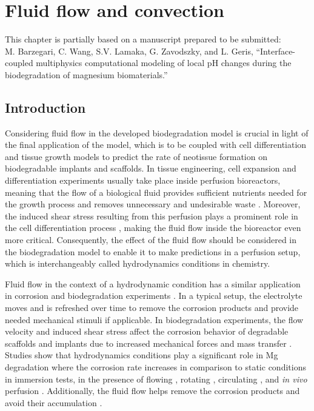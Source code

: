 \chapter{Fluid flow and convection}\label{ch:fluid}

\begin{shaded}
This chapter is partially based on a manuscript prepared to be submitted:\\
M. Barzegari, C. Wang, S.V. Lamaka, G. Zavodszky, and L. Geris, ``Interface-coupled multiphysics computational modeling of local pH changes during the biodegradation of magnesium biomaterials.''
\end{shaded}

\section{Introduction}

Considering fluid flow in the developed biodegradation model is crucial in light of the final application of the model, which is to be coupled with cell differentiation and tissue growth models to predict the rate of neotissue formation on biodegradable implants and scaffolds. In tissue engineering, cell expansion and differentiation experiments usually take place inside perfusion bioreactors, meaning that the flow of a biological fluid provides sufficient nutrients needed for the growth process and removes unnecessary and undesirable waste \cite{Sikavitsas2005,Grayson2010,Sonnaert2014}. Moreover, the induced shear stress resulting from this perfusion plays a prominent role in the cell differentiation process \cite{Song2013,McCoy2012,Rauh2011,Papantoniou2013}, making the fluid flow inside the bioreactor even more critical. Consequently, the effect of the fluid flow should be considered in the biodegradation model to enable it to make predictions in a perfusion setup, which is interchangeably called hydrodynamics conditions in chemistry.

Fluid flow in the context of a hydrodynamic condition has a similar application in corrosion and biodegradation experiments \cite{Wang2014}. In a typical setup, the electrolyte moves and is refreshed over time to remove the corrosion products and provide needed mechanical stimuli if applicable. In biodegradation experiments, the flow velocity and induced shear stress affect the corrosion behavior of degradable scaffolds and implants due to increased mechanical forces and mass transfer \cite{Wang2014}. Studies show that hydrodynamics conditions play a significant role in Mg degradation \cite{Levesque2008} where the corrosion rate increases in comparison to static conditions in immersion tests, in the presence of flowing \cite{Li2012}, rotating \cite{Jafarzadeh2009}, circulating \cite{Chen2010}, and \textit{in vivo} perfusion \cite{Witte2013}. Additionally, the fluid flow helps remove the corrosion products and avoid their accumulation \cite{Hiromoto2008}.

